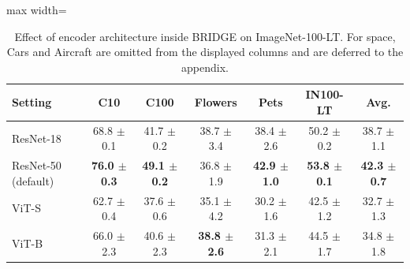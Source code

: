 \begin{table}[t]
\centering
\scriptsize
\setlength{\tabcolsep}{3.5pt}
\caption{Effect of encoder architecture inside BRIDGE on ImageNet-100-LT. For space, Cars and Aircraft are omitted from the displayed columns and are deferred to the appendix.}
\label{tab:main_ablation_architecture}
\begin{adjustbox}{max width=\textwidth}
\begin{tabular}{l c c c c c c}
\toprule
Setting & C10 & C100 & Flowers & Pets & IN100-LT & Avg. \\
\midrule
ResNet-18 & 68.8 {\scriptsize$\pm$ 0.1} & 41.7 {\scriptsize$\pm$ 0.2} & 38.7 {\scriptsize$\pm$ 3.4} & 38.4 {\scriptsize$\pm$ 2.6} & 50.2 {\scriptsize$\pm$ 0.2} & 38.7 {\scriptsize$\pm$ 1.1} \\
ResNet-50 (default) & \textbf{76.0 {\scriptsize$\pm$ 0.3}} & \textbf{49.1 {\scriptsize$\pm$ 0.2}} & 36.8 {\scriptsize$\pm$ 1.9} & \textbf{42.9 {\scriptsize$\pm$ 1.0}} & \textbf{53.8 {\scriptsize$\pm$ 0.1}} & \textbf{42.3 {\scriptsize$\pm$ 0.7}} \\
ViT-S & 62.7 {\scriptsize$\pm$ 0.4} & 37.6 {\scriptsize$\pm$ 0.6} & 35.1 {\scriptsize$\pm$ 4.2} & 30.2 {\scriptsize$\pm$ 1.6} & 42.5 {\scriptsize$\pm$ 1.2} & 32.7 {\scriptsize$\pm$ 1.3} \\
ViT-B & 66.0 {\scriptsize$\pm$ 2.3} & 40.6 {\scriptsize$\pm$ 2.3} & \textbf{38.8 {\scriptsize$\pm$ 2.6}} & 31.3 {\scriptsize$\pm$ 2.1} & 44.5 {\scriptsize$\pm$ 1.7} & 34.8 {\scriptsize$\pm$ 1.8} \\
\bottomrule
\end{tabular}
\end{adjustbox}
\end{table}
